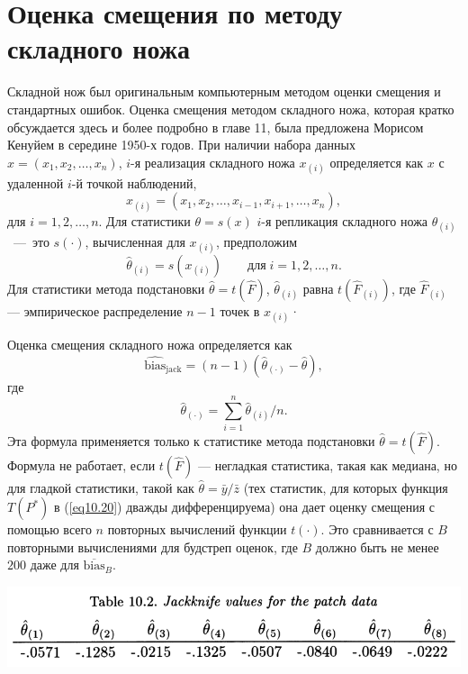 \section{Оценка смещения по методу складного ножа}

Складной нож был оригинальным компьютерным методом оценки смещения и стандартных ошибок. Оценка смещения методом складного ножа, которая кратко обсуждается здесь и более подробно в главе 11, была предложена Морисом Кенуйем в середине 1950-х годов. При наличии набора данных $x = (x_1, x_2, \dots, x_n)$, $i$-я реализация складного ножа $x_{(i)}$ определяется как $x$ с удаленной $i$-й точкой наблюдений,
\begin{equation}\label{eq10.28}
    x_{(i)} = (x_1, x_2, \dots, x_{i-1}, x_{i+1}, \dots, x_n),
\end{equation}
для $i = 1, 2, \dots, n$. Для статистики $\theta = s(x)$ $i$-я репликация складного ножа $\hat{\theta}_{(i)}$~---~это $s(\cdot)$, вычисленная для $x_{(i)}$, предположим
\begin{equation}\label{eq10.29}
    \hat{\theta}_{(i)} = s(x_{(i)}) \quad\quad \text{для}\; i = 1, 2, \dots, n.
\end{equation}
Для статистики метода подстановки $\hat{\theta} = t(\hat{F})$, $\hat{\theta}_{(i)}$ равна $t(\hat{F}_{(i)})$, где $\hat{F}_{(i)}$ --- эмпирическое распределение $n-1$ точек в $x_{(i)}$·

Оценка смещения складного ножа определяется как
\begin{equation}\label{eq10.30}
    \widehat{\text{bias}}_{\text{jack}} = (n-1)\left(\hat{\theta}_{(\cdot)} - \hat{\theta}\right),
\end{equation}
где
\begin{equation}\label{eq10.31}
    \hat{\theta}_{(\cdot)} = \sum\limits_{i=1}^{n}\hat{\theta}_{(i)}/n.
\end{equation}
Эта формула применяется только к статистике метода подстановки $\hat{\theta} = t(\hat{F})$. Формула не работает, если $t(\hat{F})$ --- негладкая статистика, такая как медиана, но для гладкой статистики, такой как $\hat{\theta} = \bar{y}/\bar{z}$ (тех статистик, для которых функция $T(P^{*})$ в (\ref{eq10.20}) дважды дифференцируема) она дает оценку смещения с помощью всего $n$ повторных вычислений функции $t(\cdot)$. Это сравнивается с $B$ повторными вычислениями для будстреп оценок, где $B$ должно быть не менее $200$ даже для $\overline{\text{bias}}_{B}$.

\noindent
\includegraphics[width=\linewidth]{10/t10.2.png}
\newline

